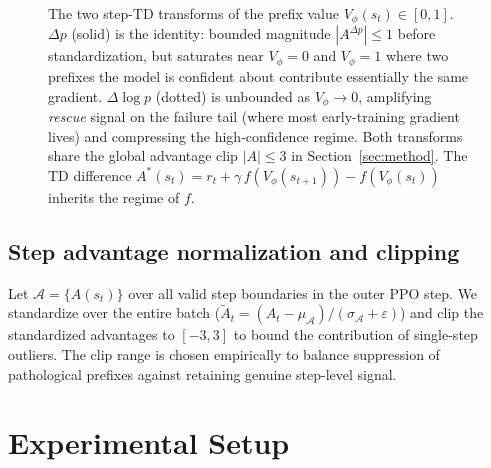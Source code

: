 \documentclass[11pt]{article}
\begin{document}
\begin{figure}[t]
\centering
{}
\caption{The two step-TD transforms of the prefix value $V_\phi(s_t)
\in [0,1]$. $\Delta p$ (solid) is the identity: bounded magnitude
$|A^{\Delta p}| \leq 1$ before standardization, but saturates near
$V_\phi = 0$ and $V_\phi = 1$ where two prefixes the model is
confident about contribute essentially the same gradient.
$\Delta\log p$ (dotted) is unbounded as $V_\phi \to 0$, amplifying
\emph{rescue} signal on the failure tail (where most early-training
gradient lives) and compressing the high-confidence regime. Both
transforms share the global advantage clip $|A| \leq 3$ in
Section~\ref{sec:method}. The TD difference
$A^*(s_t) = r_t + \gamma\,f(V_\phi(s_{t+1})) - f(V_\phi(s_t))$
inherits the regime of $f$.}
\label{fig:transforms}
\end{figure}

\subsection{Step advantage normalization and clipping}
Let $\mathcal{A} = \{A(s_t)\}$ over all valid step boundaries in the outer
PPO step. We standardize over the entire batch
($\widetilde{A}_t = (A_t - \mu_{\mathcal{A}}) / (\sigma_{\mathcal{A}} +
\varepsilon)$) and clip the standardized advantages to $[-3, 3]$ to bound the
contribution of single-step outliers. The clip range is chosen empirically to
balance suppression of pathological prefixes against retaining genuine
step-level signal.

\section{Experimental Setup}
\label{sec:setup}
\end{document}
